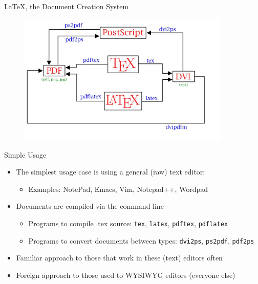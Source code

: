 \documentclass{beamer}
\begin{document}
\begin{frame}{\LaTeX, the Document Creation System}
    \begin{figure}
        \begin{center}
        \includegraphics[width=0.9\textwidth]{LaTeXdiagram}
        \end{center}
    \end{figure}
\end{frame}

\begin{frame}{Simple Usage}
  \begin{itemize}
    \item
      The simplest usage case is using a general (raw) text editor:
    \begin{itemize}
      \item Examples: NotePad, Emacs, Vim, Notepad++, Wordpad
    \end{itemize}
    \item
      Documents are compiled via the command line
    \begin{itemize}
      \item Programs to compile .tex source:
        {\tt tex}, {\tt latex}, {\tt pdftex}, {\tt pdflatex}
      \item Programs to convert documents between types:
        {\tt dvi2ps}, {\tt ps2pdf}, {\tt pdf2ps}
    \end{itemize}
    \item
      Familiar approach to those that work in these (text) editors often
    \item
      Foreign approach to those used to WYSIWYG editors (everyone else)
  \end{itemize}
\end{frame}
\end{document}
